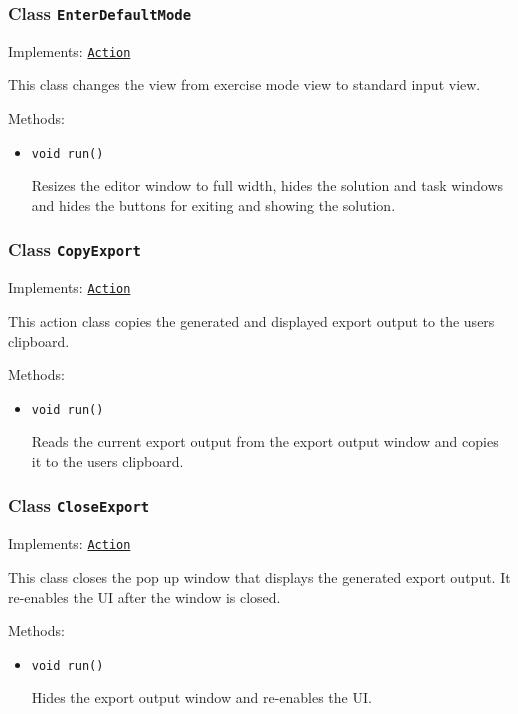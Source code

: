 \subsubsection{Class \texttt{EnterDefaultMode}}
\label{type:edu.kit.wavelength.client.view.action.EnterDefaultMode}
Implements: \texttt{\hyperref[type:edu.kit.wavelength.client.view.action.Action]{Action}}

This class changes the view from exercise mode view to standard input view.

Methods:
\begin{itemize}
\item \texttt{void run()}

Resizes the editor window to full width, hides the solution and task windows
 and hides the buttons for exiting and showing the solution.

\end{itemize}

\subsubsection{Class \texttt{CopyExport}}
\label{type:edu.kit.wavelength.client.view.action.CopyExport}
Implements: \texttt{\hyperref[type:edu.kit.wavelength.client.view.action.Action]{Action}}

This action class copies the generated and displayed export output to the
 users clipboard.

Methods:
\begin{itemize}
\item \texttt{void run()}

Reads the current export output from the export output window and copies it
 to the users clipboard.

\end{itemize}

\subsubsection{Class \texttt{CloseExport}}
\label{type:edu.kit.wavelength.client.view.action.CloseExport}
Implements: \texttt{\hyperref[type:edu.kit.wavelength.client.view.action.Action]{Action}}

This class closes the pop up window that displays the generated export
 output. It re-enables the UI after the window is closed.

Methods:
\begin{itemize}
\item \texttt{void run()}

Hides the export output window and re-enables the UI.

\end{itemize}

